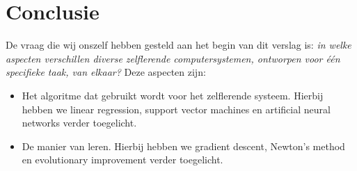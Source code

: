 \documentclass[a4paper,titlepage]{article}
\begin{document}
\newpage


\newpage


\newpage


\newpage


\newpage


\newpage


\newpage


\newpage
\section{Conclusie}
De vraag die wij onszelf hebben gesteld aan het begin van dit verslag is: \textit{in welke aspecten verschillen diverse zelflerende computersystemen, ontworpen voor \'e\'en specifieke taak, van elkaar?} Deze aspecten zijn:
\begin{itemize}  
\item Het algoritme dat gebruikt wordt voor het zelflerende systeem. Hierbij hebben we linear regression, support vector machines en artificial neural networks verder toegelicht.
\item De manier van leren. Hierbij hebben we gradient descent, Newton's method en evolutionary improvement verder toegelicht.
\end{itemize}


\newpage
\nocite{nonCitedSource1}
\nocite{nonCitedSource2}
\nocite{nonCitedSource3}
\nocite{nonCitedSource4}
\nocite{nonCitedSource5}
\nocite{nonCitedSource6}
\nocite{nonCitedSource7}
\nocite{nonCitedSource8}
\nocite{nonCitedSource9}
\nocite{nonCitedSource10}
\nocite{nonCitedSource11}
\nocite{nonCitedSource12}
\nocite{nonCitedSource13}
\printbibheading[title={Bronnen},heading=bibnumbered]
\printbibliography[keyword=Hoofdstuk2,heading=subbibnumbered,title={Hoofdstuk 2}]
\printbibliography[keyword=Hoofdstuk3,heading=subbibnumbered,title={Hoofdstuk 3}]
\printbibliography[keyword=Hoofdstuk4,heading=subbibnumbered,title={Hoofdstuk 4}]
\printbibliography[keyword=Hoofdstuk5,heading=subbibnumbered,title={Hoofdstuk 5}]
\printbibliography[keyword=Hoofdstuk6,heading=subbibnumbered,title={Hoofdstuk 6}]
\printbibliography[keyword=Hoofdstuk7,heading=subbibnumbered,title={Hoofdstuk 7}]
\printbibliography[keyword=Hoofdstuk8,heading=subbibnumbered,title={Hoofdstuk 8}]
\printbibliography[keyword=Hoofdstuk9,heading=subbibnumbered,title={Hoofdstuk 9}]
\end{document}

